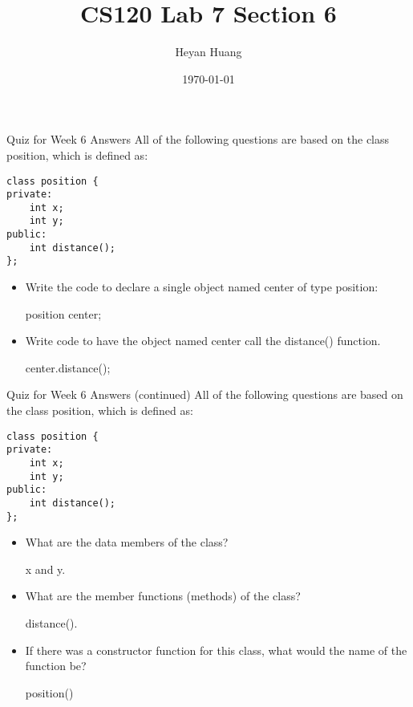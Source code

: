 \documentclass[presentation]{beamer}
\author{Heyan Huang}
\date{\today}
\title{CS120 Lab \alert{7} Section \alert{6}}
\begin{document}
\maketitle

\begin{frame}[fragile,label=sec-1]{Quiz for Week 6 \alert{Answers}}
 All of the following questions are based on the class position, which is defined as:
\begin{verbatim}
class position {
private:
    int x;
    int y;
public:
    int distance();
};
\end{verbatim}
\begin{itemize}
\item Write the code to declare a single object named \alert{center} of type position:

\alert{position center;}
\item Write code to have the object named center call the \alert{distance()} function.

\alert{center.distance();}
\end{itemize}
\end{frame}

\begin{frame}[fragile,label=sec-2]{Quiz for Week 6 \alert{Answers} (continued)}
 All of the following questions are based on the class position, which is defined as:
\begin{verbatim}
class position {
private:
    int x;
    int y;
public:
    int distance();
};
\end{verbatim}
\begin{itemize}
\item What are the data members of the class?

\alert{x and y.}
\item What are the member functions (methods) of the class?

\alert{distance().}
\item If there was a constructor function for this class, what would the name of the function be?

\alert{position()}
\end{itemize}
\end{frame}
\end{document}
